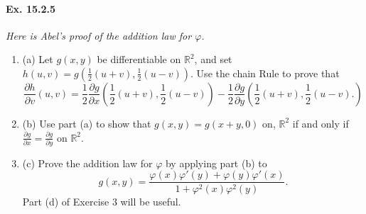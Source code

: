 \documentclass[11pt,a4paper]{article}
\newcommand{\be} {\begin{enumerate}}
\newcommand{\ee} {\end{enumerate}}
\newcommand{\R}{\mathbb{R}}
\begin{document}
\paragraph{Ex. 15.2.5}{\it Here is Abel's proof of the addition law for $\varphi$.
\be
\item[(a)]
Let $g(x,y)$ be differentiable on $\R^2$, and set $h(u,v) = g\left(\frac{1}{2}(u+v), \frac{1}{2}(u-v)\right)$. Use the chain Rule to prove that
$$\frac{\partial h}{\partial v}(u,v) = \frac{1}{2}\frac{\partial g}{\partial x}\left(\frac{1}{2}(u+v), \frac{1}{2}(u-v)\right)-\frac{1}{2}\frac{\partial g}{\partial y}\left(\frac{1}{2}(u+v), \frac{1}{2}(u-v).\right)$$
\item[(b)] Use part (a) to show that $g(x,y) = g(x+y, 0)$ on, $\R^2$ if and only if $\frac{\partial g}{\partial x} = \frac{\partial g}{\partial y}$ on $\R^2$.
\item[(c)] Prove the addition law for $\varphi$ by applying part (b) to
$$g(x,y) = \frac{\varphi(x) \varphi'(y) + \varphi(y) \varphi'(x)}{1 + \varphi^2(x) \varphi^2(y)}.$$
Part (d) of Exercise 3 will be useful.
\ee
}
\end{document}
